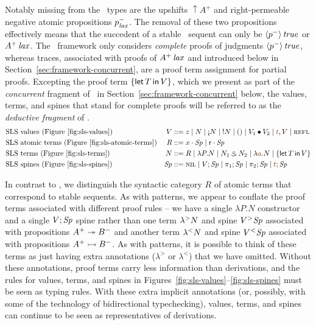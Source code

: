 Notably missing from the \sls~types are the upshifts ${\uparrow}A^+$
and right-permeable negative atomic propositions $p^-_{\it lax}$. The
removal of these two propositions effectively means that the succedent
of a stable \sls~sequent can only be ${\langle {p^-} \rangle}\,{{\it true}}$ or
${A^+}\,{{\it lax}}$. The \sls~framework only considers {\it complete} proofs
of judgments ${\langle {p^-} \rangle}\,{{\it true}}$, whereas traces, associated with
proofs of ${A^+}\,{{\it lax}}$ and introduced below in
Section~\ref{sec:framework-concurrent}, are a proof term assignment
for partial proofs. Excepting the proof term $\{{\sf let}\,{T}\,{\sf in}\, {V} \}$, which we
present as part of the {\it concurrent} fragment of \sls~in
Section~\ref{sec:framework-concurrent} below, the values, terms, and
spines that stand for complete proofs will be referred to as the {\it
  deductive fragment} of \sls.
\begin{align*}
&\mbox{\sls~values (Figure~\ref{fig:sls-values})}& 
V & ::= z
   \mid N
   \mid \tgnabr{N}
   \mid \tbangr{N}
   \mid \toner
   \mid \tfuser{V_1}{V_2}
   \mid \texistsr{\lf{t}}{V}
   \mid \tunifr
\\
&\mbox{\sls~atomic terms (Figure~\ref{fig:sls-atomic-terms})}&
R & ::= \tfocusl{x}{\Sp} 
   \mid \tfocusl{\sf r}{\Sp} 
\\
&\mbox{\sls~terms (Figure~\ref{fig:sls-terms})}&
N & ::= R
   \mid \lambda P.N 
   \mid N_1 \with N_2
   \mid \lambda \lf{a}.{N}
   \mid \tlet{T}{V}
\\
&\mbox{\sls~spines (Figure~\ref{fig:sls-spines})}&
\Sp & ::= \tnil 
   \mid V; \Sp
   \mid \pi_1; \Sp 
   \mid \pi_2; \Sp
   \mid \lf{t}; \Sp
\end{align*}

In contrast to \ollll, we distinguish the syntactic category $R$ of
atomic terms that correspond to stable sequents. As with patterns, we
appear to conflate the proof terms associated with different proof
rules -- we have a single $\lambda P.N$ constructor and a single
$V;{\it Sp}$ spine rather than one term ${\lambda}^{>}{N}$ and spine
${V}{^{>}}{{\it Sp}}$ associated with propositions $A^+ \twoheadrightarrow B^-$ and
another term ${\lambda}^{<}{N}$ and spine ${V}{^{<}}{{\it Sp}}$ associated with
propositions $A^+ \rightarrowtail B^-$.  As with patterns, it is possible to
think of these terms as just having extra annotations ($\lambda^>$ or
$\lambda^<$) that we have omitted.  Without these annotations, proof
terms carry less information than derivations, and the rules for
values, terms, and spines in
Figures~\ref{fig:sls-values}--\ref{fig:sls-spines} must be seen as
typing rules. With these extra implicit annotations (or, possibly,
with some of the technology of bidirectional typechecking), values,
terms, and spines can continue to be seen as representatives of
derivations.


